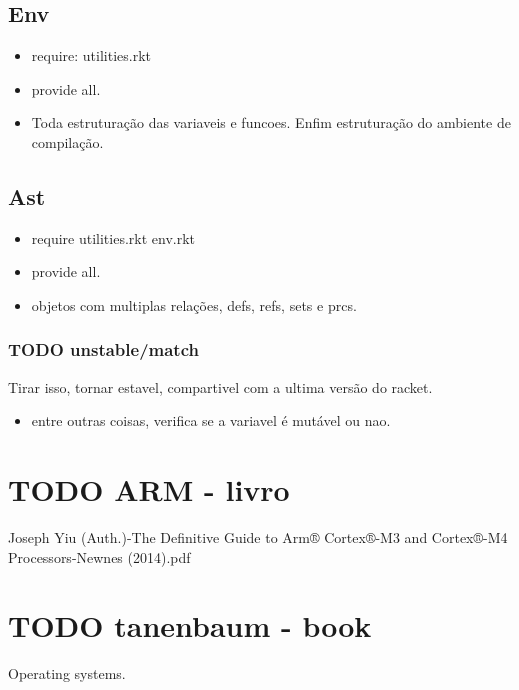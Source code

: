 \documentclass[11pt]{article}
\begin{document}
\subsection{Env}
\label{sec-3-3}

\begin{itemize}
\item require: utilities.rkt
\item provide all.
\item Toda estruturação das variaveis e funcoes. Enfim estruturação do ambiente de compilação.
\end{itemize}

\subsection{Ast}
\label{sec-3-4}
\begin{itemize}
\item require utilities.rkt env.rkt
\item provide all.
\item objetos com multiplas relações, defs, refs, sets e prcs.
\end{itemize}

\subsubsection{{\bfseries\sffamily TODO} unstable/match}
\label{sec-3-4-1}

Tirar isso, tornar estavel, compartivel com a ultima versão do racket.

\begin{itemize}
\item entre outras coisas, verifica se a variavel é mutável ou nao.
\end{itemize}


\section{{\bfseries\sffamily TODO} ARM - livro}
\label{sec-4}

Joseph Yiu (Auth.)-The Definitive Guide to Arm® Cortex®-M3 and Cortex®-M4 Processors-Newnes (2014).pdf

\section{{\bfseries\sffamily TODO} tanenbaum - book}
\label{sec-5}

Operating systems.
\end{document}
